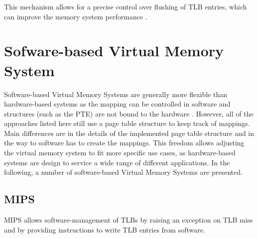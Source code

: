 This mechanism allows for a precise control over flushing of TLB entries, which can improve the
memory system performance \cite{RISCVInstructionSet}.










\section{Sofware-based Virtual Memory System}

Software-based Virtual Memory Systems are generally more flexible than hardware-based systems
as the mapping can be controlled in software and structures (such as the PTE) are not bound
to the hardware \cite{jacob1998virtualissues}.
However, all of the approaches listed here still use a page table structure to keep track of mappings.
Main differences are in the details of the implemented page table structure and in the way to software has to create the mappings. This freedom allows adjusting the virtual memory system to fit more specific use cases, as hardware-based systems are design to service a wide range of different applications\cite{citation needed}.
In the following, a number of software-based Virtual Memory Systems are presented.
\subsection{MIPS}
MIPS \cite{MIPSArchitectureProgrammers2016} allows software-management of TLBs by raising an exception on TLB miss and by providing instructions to write TLB entries from software.

